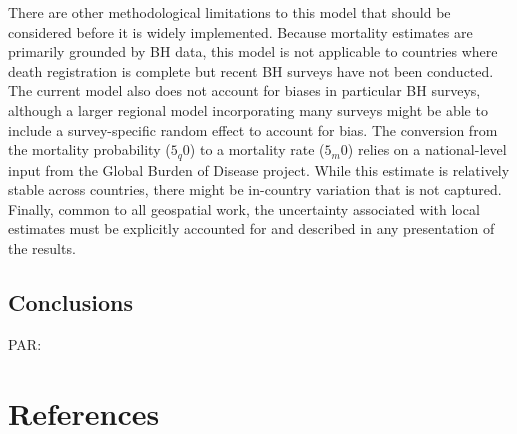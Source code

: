 \documentclass[
]{article}
\begin{document}
There are other methodological limitations to this model that should be considered before it is widely implemented. Because mortality estimates are primarily grounded by BH data, this model is not applicable to countries where death registration is complete but recent BH surveys have not been conducted. The current model also does not account for biases in particular BH surveys, although a larger regional model incorporating many surveys might be able to include a survey-specific random effect to account for bias. The conversion from the mortality probability (\(5_q0\)) to a mortality rate (\(5_m0\)) relies on a national-level input from the Global Burden of Disease project. While this estimate is relatively stable across countries, there might be in-country variation that is not captured. Finally, common to all geospatial work, the uncertainty associated with local estimates must be explicitly accounted for and described in any presentation of the results.

\hypertarget{conclusions}{%
\subsection{Conclusions}\label{conclusions}}

PAR:

\hypertarget{references}{%
\section{References}\label{references}}
\end{document}
